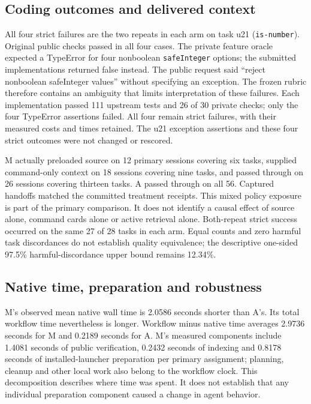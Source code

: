 \documentclass[manuscript,screen,nonacm]{acmart}
\begin{document}
\subsection{Coding outcomes and delivered
context}\label{coding-outcomes-and-delivered-context}

All four strict failures are the two repeats in each arm on task u21
(\texttt{is-number}). Original public checks passed in all four cases.
The private feature oracle expected a TypeError for four nonboolean
\texttt{safeInteger} options; the submitted implementations returned
false instead. The public request said ``reject nonboolean safeInteger
values'' without specifying an exception. The frozen rubric therefore
contains an ambiguity that limits interpretation of these failures. Each
implementation passed 111 upstream tests and 26 of 30 private checks;
only the four TypeError assertions failed. All four remain strict
failures, with their measured costs and times retained. The u21
exception assertions and these four strict outcomes were not changed or
rescored.

M actually preloaded source on 12 primary sessions covering six tasks,
supplied command-only context on 18 sessions covering nine tasks, and
passed through on 26 sessions covering thirteen tasks. A passed through
on all 56. Captured handoffs matched the committed treatment receipts.
This mixed policy exposure is part of the primary comparison. It does
not identify a causal effect of source alone, command cards alone or
active retrieval alone. Both-repeat strict success occurred on the same
27 of 28 tasks in each arm. Equal counts and zero harmful task
discordances do not establish quality equivalence; the descriptive
one-sided 97.5\% harmful-discordance upper bound remains 12.34\%.

\subsection{Native time, preparation and
robustness}\label{native-time-preparation-and-robustness}

M's observed mean native wall time is 2.0586 seconds shorter than A's.
Its total workflow time nevertheless is longer. Workflow minus native
time averages 2.9736 seconds for M and 0.2189 seconds for A. M's
measured components include 1.4081 seconds of public verification,
0.2432 seconds of indexing and 0.8178 seconds of installed-launcher
preparation per primary assignment; planning, cleanup and other local
work also belong to the workflow clock. This decomposition describes
where time was spent. It does not establish that any individual
preparation component caused a change in agent behavior.
\end{document}
